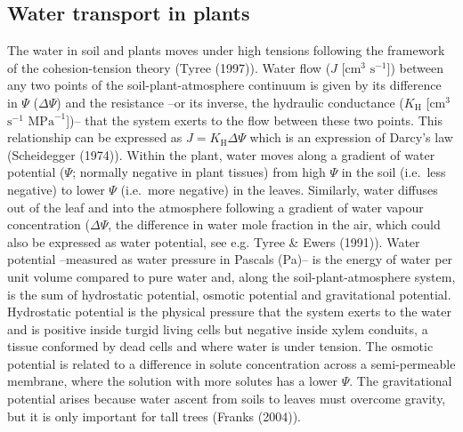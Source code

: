 \documentclass[11pt,twoside]{reedthesis}
\begin{document}
\subsection{Water transport in plants}\label{water-transport-in-plants}

The water in soil and plants moves under high tensions following the
framework of the cohesion-tension theory (Tyree (1997)). Water flow
(\(J\) {[}\(\text{cm}^3\) \(\text{s}^{-1}\){]}) between any two points
of the soil-plant-atmosphere continuum is given by its difference in
\(\Psi\) (\(\Delta\Psi\)) and the resistance --or its inverse, the
hydraulic conductance (\(K_{\text{H}}\) {[}\(\text{cm}^3\)
\(\text{s}^{-1}\) \(\text{MPa}^{-1}\){]})-- that the system exerts to
the flow between these two points. This relationship can be expressed as
\(J = K_\text{H}\Delta\Psi\) which is an expression of Darcy's law
(Scheidegger (1974)). Within the plant, water moves along a gradient of
water potential (\(\Psi\); normally negative in plant tissues) from high
\(\Psi\) in the soil (i.e.~less negative) to lower \(\Psi\) (i.e.~more
negative) in the leaves. Similarly, water diffuses out of the leaf and
into the atmosphere following a gradient of water vapour concentration
(\(\Delta\Psi\), the difference in water mole fraction in the air, which
could also be expressed as water potential, see e.g. Tyree \& Ewers
(1991)). Water potential --measured as water pressure in Pascals (Pa)--
is the energy of water per unit volume compared to pure water and, along
the soil-plant-atmosphere system, is the sum of hydrostatic potential,
osmotic potential and gravitational potential. Hydrostatic potential is
the physical pressure that the system exerts to the water and is
positive inside turgid living cells but negative inside xylem conduits,
a tissue conformed by dead cells and where water is under tension. The
osmotic potential is related to a difference in solute concentration
across a semi-permeable membrane, where the solution with more solutes
has a lower \(\Psi\). The gravitational potential arises because water
ascent from soils to leaves must overcome gravity, but it is only
important for tall trees (Franks (2004)).\par
\end{document}
